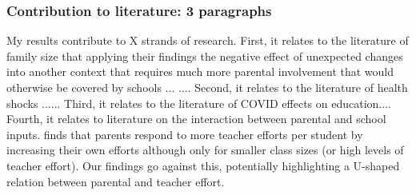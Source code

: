 

\subsubsection{Contribution to literature: 3 paragraphs}

My results contribute to X strands of research. First, it relates to the literature of family size that applying their findings the negative effect of unexpected changes into another context that requires much more parental involvement that would otherwise be covered by schools ... \cite{black_small_2010}.... Second, it relates to the literature of health shocks ...\cite{black_sibling_2021}... Third, it relates to the literature of COVID effects on education.... Fourth, it relates to literature on the interaction between parental and school inputs. \cite{bonesronning_determinants_2004} finds that parents respond to more teacher efforts per student by increasing their own efforts although only for smaller class sizes (or high levels of teacher effort). Our findings go against this, potentially highlighting a U-shaped relation between parental and teacher effort.


